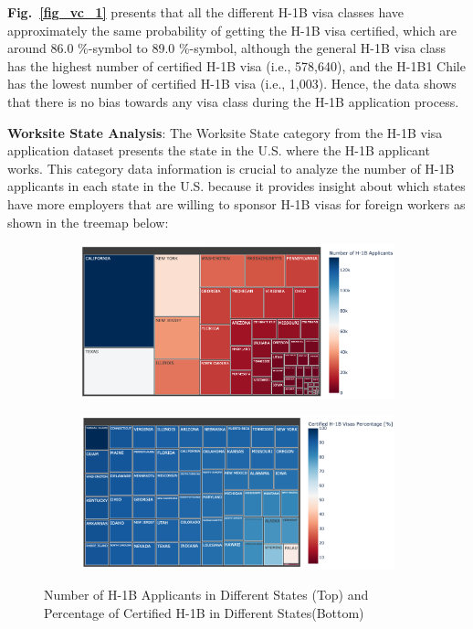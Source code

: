 \documentclass[conference]{IEEEtran}
\begin{document}
\textbf{Fig.~\ref{fig_vc_1}} presents that all the different H-1B visa classes have approximately the same probability of getting the H-1B visa certified, which are around 86.0 \%-symbol to 89.0 \%-symbol, although the general H-1B visa class has the highest number of certified H-1B visa (i.e., 578,640), and the H-1B1 Chile has the lowest number of certified H-1B visa (i.e., 1,003). Hence, the data shows that there is no bias towards any visa class during the H-1B application process.

\textbf{Worksite State Analysis}: The Worksite State category from the H-1B visa application dataset presents the state in the U.S. where the H-1B applicant works. This category data information is crucial to analyze the number of H-1B applicants in each state in the U.S. because it provides insight about which states have more employers that are willing to sponsor H-1B visas for foreign workers as shown in the treemap below:

\begin{figure}[h]
\begin{subfigure}[h]{.3\textwidth}
\centering
\includegraphics[scale=0.3]{State_NA.png}  
\end{subfigure}
\begin{subfigure}[h]{.3\textwidth}
\centering
\includegraphics[scale=0.3]{State_Prob.png}  
\end{subfigure}
\caption{Number of H-1B Applicants in Different States (Top) and Percentage of Certified H-1B in Different States(Bottom)}
\label{fig_ws}
\end{figure}
\end{document}
